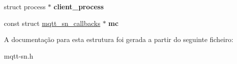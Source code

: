\begin{DoxyCompactItemize}
\item 
\hypertarget{structmqtt__sn__connection_a9a77d0584b9412e8139bd1593e958bc6}{struct process $\ast$ {\bfseries client\+\_\+process}}\label{structmqtt__sn__connection_a9a77d0584b9412e8139bd1593e958bc6}

\item 
\hypertarget{structmqtt__sn__connection_a091e65235231be3ce1f4dbcfd746e727}{const struct \hyperlink{structmqtt__sn__callbacks}{mqtt\+\_\+sn\+\_\+callbacks} $\ast$ {\bfseries mc}}\label{structmqtt__sn__connection_a091e65235231be3ce1f4dbcfd746e727}

\end{DoxyCompactItemize}


A documentação para esta estrutura foi gerada a partir do seguinte ficheiro\+:\begin{DoxyCompactItemize}
\item 
mqtt-\/sn.\+h\end{DoxyCompactItemize}
